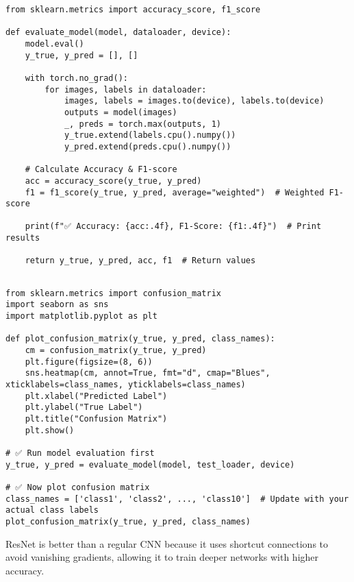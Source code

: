 \begin{verbatim}
from sklearn.metrics import accuracy_score, f1_score

def evaluate_model(model, dataloader, device):
    model.eval()
    y_true, y_pred = [], []

    with torch.no_grad():
        for images, labels in dataloader:
            images, labels = images.to(device), labels.to(device)
            outputs = model(images)
            _, preds = torch.max(outputs, 1)
            y_true.extend(labels.cpu().numpy())
            y_pred.extend(preds.cpu().numpy())

    # Calculate Accuracy & F1-score
    acc = accuracy_score(y_true, y_pred)
    f1 = f1_score(y_true, y_pred, average="weighted")  # Weighted F1-score

    print(f"✅ Accuracy: {acc:.4f}, F1-Score: {f1:.4f}")  # Print results

    return y_true, y_pred, acc, f1  # Return values


\end{verbatim}

\begin{verbatim}
from sklearn.metrics import confusion_matrix
import seaborn as sns
import matplotlib.pyplot as plt

def plot_confusion_matrix(y_true, y_pred, class_names):
    cm = confusion_matrix(y_true, y_pred)
    plt.figure(figsize=(8, 6))
    sns.heatmap(cm, annot=True, fmt="d", cmap="Blues", xticklabels=class_names, yticklabels=class_names)
    plt.xlabel("Predicted Label")
    plt.ylabel("True Label")
    plt.title("Confusion Matrix")
    plt.show()

# ✅ Run model evaluation first
y_true, y_pred = evaluate_model(model, test_loader, device)

# ✅ Now plot confusion matrix
class_names = ['class1', 'class2', ..., 'class10']  # Update with your actual class labels
plot_confusion_matrix(y_true, y_pred, class_names)

\end{verbatim}

ResNet is better than a regular CNN because it uses shortcut connections to avoid vanishing gradients, allowing it to train deeper networks with higher accuracy.




